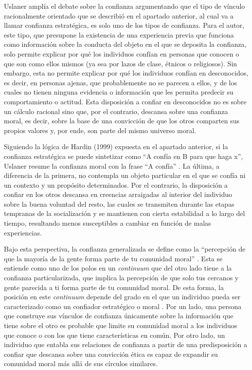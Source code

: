 \documentclass[12pt,twoside]{templates/facsothesis}
\begin{document}
Uslaner \citetext{\citeyear{uslanerMoralFoundationsTrust2002}; \citeyear{uslanerStudyTrust2017}} amplía el debate sobre la confianza argumentando que el tipo de vínculo racionalmente orientado que se describió en el apartado anterior, al cual va a llamar confianza estratégica, es solo uno de los tipos de confianza. Para el autor, este tipo, que presupone la existencia de una experiencia previa que funciona como información sobre la conducta del objeto en el que se deposita la confianza, solo permite explicar por qué los individuos confían en personas que conocen o que son como ellos mismos (ya sea por lazos de clase, étnicos o religiosos). Sin embargo, esta no permite explicar por qué los individuos confían en desconocidos, es decir, en personas ajenas, que probablemente no se parecen a ellos, y de los cuales no tienen ninguna evidencia o información que les permita predecir su comportamiento o actitud. Esta disposición a confiar en desconocidos no es sobre un cálculo racional sino que, por el contrario, descansa sobre una confianza moral, es decir, sobre la base de una convicción de que los otros comparten sus propios valores y, por ende, son parte del mismo universo moral.

Siguiendo la lógica de Hardin (1999) expuesta en el apartado anterior, si la confianza estratégica se puede sintetizar como ``A confía en B para que haga x'', Uslaner resume la confianza moral con la frase ``A confía'' \citep[21]{uslanerMoralFoundationsTrust2002}. La última, a diferencia de la primera, no contempla un objeto particular en el que se confía ni un contexto y un propósito determinados. Por el contrario, la disposición a confiar en los otros descansa en creencias arraigadas al interior del individuo sobre la buena voluntad del resto, las cuales se transmiten durante las etapas tempranas de la socialización y se mantienen con cierta estabilidad a lo largo del tiempo, resultando menos susceptibles a cambiar en función de malas experiencias.

Bajo esta perspectiva, la confianza generalizada se define como la ``percepción de que la mayoría de la gente forma parte de tu comunidad moral'' \citep[26]{uslanerMoralFoundationsTrust2002}. Esta se entiende como uno de los polos en un \emph{continuum} que del otro lado tiene a la confianza particularizada, que implica la percepción de que solo tus cercanos y gente parecida a ti forma parte de tu comunidad moral. De esta forma, la posición en este \emph{continuum} depende del grado en el que un individuo pueda ser caracterizado como un confiador estratégico o moral \citep{oskarssonGeneralizedTrustPolitical2010}. Por un lado, una persona que construye sus vínculos de confianza únicamente sobre la información que tiene sobre el otro es probable que limite su comunidad moral a los individuos que conoce o con los que tiene características en común. Por otro lado, un individuo que entabla sus relaciones de confianza a partir de una predisposición a confiar que descansa sobre una convicción ética es capaz de expandir su comunidad moral más allá de sus círculos similares.
\end{document}
